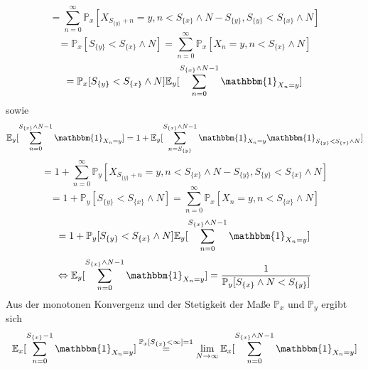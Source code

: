 \begin{itemize}
\begin{equation*}
= \sum_{n=0}^{\infty} \mathbb{P}_{x}[X_{S_{\lbrace y \rbrace} + n}=y,n<S_{\lbrace x \rbrace} \wedge N - S_{\lbrace y \rbrace}, S_{\lbrace y \rbrace} < S_{\lbrace x \rbrace} \wedge N]
\end{equation*}
\begin{equation*}
= \mathbb{P}_{x}[S_{\lbrace y \rbrace} < S_{\lbrace x \rbrace} \wedge N]= \sum_{n=0}^{\infty} \mathbb{P}_{x}[X_{n}=y,n<S_{\lbrace x \rbrace} \wedge N]
\end{equation*}
\begin{equation*}
= \mathbb{P}_{x}[S_{\lbrace y \rbrace} < S_{\lbrace x \rbrace} \wedge N]\mathbb{E}_{y}[\sum_{n=0}^{S_{\lbrace x \rbrace} \wedge N -1}  \mathbbm{1}_{X_{n} = y}]
\end{equation*}
sowie
\begin{equation*}
\mathbb{E}_{y}[\sum_{n=0}^{S_{\lbrace x \rbrace} \wedge N -1}  \mathbbm{1}_{X_{n} = y}] = 1 + \mathbb{E}_{y}[\sum_{n=S_{\lbrace y \rbrace}}^{S_{\lbrace x \rbrace} \wedge N -1}  \mathbbm{1}_{X_{n} = y} \mathbbm{1}_{S_{\lbrace y \rbrace} < S_{\lbrace x \rbrace} \wedge N}]
\end{equation*}
\begin{equation*}
= 1 + \sum_{n=0}^{\infty} \mathbb{P}_{y}[X_{S_{\lbrace y \rbrace} + n}=y,n<S_{\lbrace x \rbrace} \wedge N - S_{\lbrace y \rbrace}, S_{\lbrace y \rbrace} < S_{\lbrace x \rbrace} \wedge N]
\end{equation*}
\begin{equation*}
= 1 + \mathbb{P}_{y}[S_{\lbrace y \rbrace} < S_{\lbrace x \rbrace} \wedge N]= \sum_{n=0}^{\infty} \mathbb{P}_{x}[X_{n}=y,n<S_{\lbrace x \rbrace} \wedge N]
\end{equation*}
\begin{equation*}
= 1 + \mathbb{P}_{y}[S_{\lbrace y \rbrace} < S_{\lbrace x \rbrace} \wedge N]\mathbb{E}_{y}[\sum_{n=0}^{S_{\lbrace x \rbrace} \wedge N -1}  \mathbbm{1}_{X_{n} = y}]
\end{equation*}
\begin{equation*}
\Leftrightarrow \mathbb{E}_{y}[\sum_{n=0}^{S_{\lbrace x \rbrace} \wedge N -1}  \mathbbm{1}_{X_{n} = y}] = \dfrac{1}{ \mathbb{P}_{y}[S_{\lbrace x \rbrace} \wedge N < S_{\lbrace y \rbrace}]}
\end{equation*}
Aus der monotonen Konvergenz und der Stetigkeit der Maße $\mathbb{P}_{x}$ und $\mathbb{P}_{y}$ ergibt sich
\begin{equation*}
\mathbb{E}_{x}[\sum_{n=0}^{S_{\lbrace x \rbrace} -1}  \mathbbm{1}_{X_{n} = y}] \stackrel{\mathbb{P}_{x}[S_{\lbrace x \rbrace} < \infty]=1}{=} \lim_{N \to \infty} \mathbb{E}_{x}[\sum_{n=0}^{S_{\lbrace x \rbrace} \wedge N -1}  \mathbbm{1}_{X_{n} = y}]

\end{equation*}
\end{itemize}
